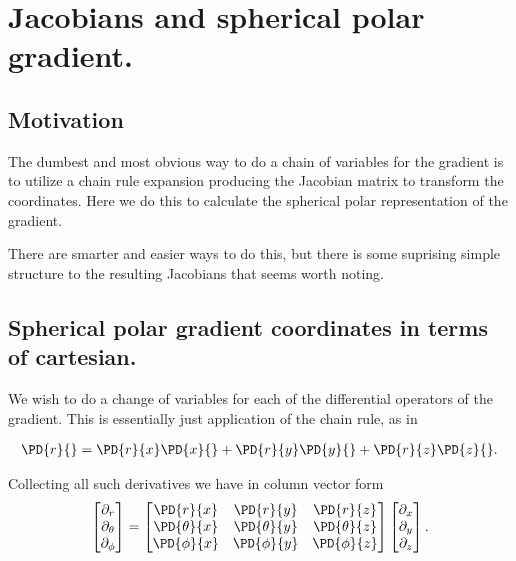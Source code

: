 

\chapter{Jacobians and spherical polar gradient.}
\label{chap:jacobianSphericalPolar}
{}
\date{Dec 6, 2009}

\beginArtWithToc

\section{Motivation}

The dumbest and most obvious way to do a chain of variables for the gradient is to utilize a chain rule expansion producing the Jacobian matrix to transform the coordinates.  Here we do this to calculate the spherical polar representation of the gradient.

There are smarter and easier ways to do this, but there is some suprising simple structure to the resulting Jacobians that seems worth noting.

\section{Spherical polar gradient coordinates in terms of cartesian.}

We wish to do a change of variables for each of the differential operators of the gradient.  This is essentially just application of the chain rule, as in

\begin{align}\label{eqn:jacobianSphericalPolar:1}
\PD{r}{} 
= 
\PD{r}{x} \PD{x}{}
+\PD{r}{y} \PD{y}{}
+\PD{r}{z} \PD{z}{}.
\end{align}

Collecting all such derivatives we have in column vector form 
\begin{align}\label{eqn:jacobianSphericalPolar:2}
\begin{bmatrix}
\partial_r \\
\partial_\theta \\
\partial_\phi
\end{bmatrix}
= 
\begin{bmatrix}
\PD{r}{x} &\PD{r}{y} &\PD{r}{z}  \\
\PD{\theta}{x} &\PD{\theta}{y} &\PD{\theta}{z}  \\
\PD{\phi}{x} &\PD{\phi}{y} &\PD{\phi}{z} 
\end{bmatrix}
\begin{bmatrix}
\partial_x \\
\partial_y \\
\partial_z
\end{bmatrix}.
\end{align}

